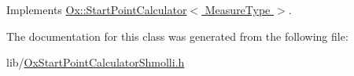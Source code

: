 Implements \hyperlink{class_ox_1_1_start_point_calculator_acd2a221872002157f232e1e7f73a1859}{Ox\-::\-Start\-Point\-Calculator$<$ Measure\-Type $>$}.



The documentation for this class was generated from the following file\-:\begin{DoxyCompactItemize}
\item 
lib/\hyperlink{_ox_start_point_calculator_shmolli_8h}{Ox\-Start\-Point\-Calculator\-Shmolli.\-h}\end{DoxyCompactItemize}
